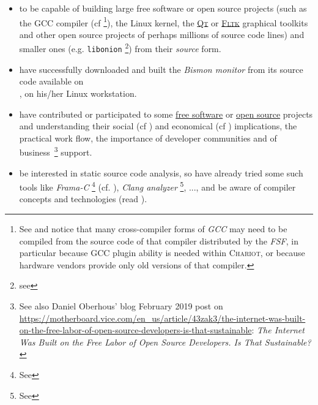 \begin{itemize}
\item to be capable of building large free software or open source projects (such as
  the GCC compiler (cf \cite{gcc-internals} \footnote{See
   and notice that many cross-compiler forms
  of \emph{GCC} may need to be compiled from the source code of that
  compiler distributed by the \emph{FSF}, in particular because GCC
  plugin ability is needed within \textsc{Chariot}, or because
  hardware vendors provide only old versions of that compiler.}), the
  Linux kernel, the \href{https://qt.io/}{\textsc{Qt}} or
  \href{https://www.fltk.org/}{\textsc{Fltk}} graphical toolkits and
  other open source projects of perhaps millions of source code lines)
  and smaller ones (e.g. \texttt{libonion} \footnote{see
  }) from their \emph{source}
   
   form.

\item have successfully downloaded and built the \emph{Bismon monitor}
   from its source code  available on
  \\ , on his/her Linux
  workstation.
  
\item have contributed or participated to some
  \href{https://www.gnu.org/philosophy/free-sw.en.html}{free software}
  or \href{https://opensource.org/}{open source} projects and
  understanding their social (cf \cite{Raymond:2001:CathBaz}) and
  economical (cf \cite{Weber:2004:SuccessOpenSource,
    Tirole:2018:eco-bien-commun, Nagle:2018:Contributing,
    DiCosmo:1998:Holdup, Lerner-Tirole:2000:economics-open-source})
  implications, the practical work flow, the importance of developer
  communities and of business~\footnote{See also Daniel Oberhous' blog
  February 2019 post on
  \url{https://motherboard.vice.com/en_us/article/43zak3/the-internet-was-built-on-the-free-labor-of-open-source-developers-is-that-sustainable}:
  \emph{The Internet Was Built on the Free Labor of Open Source
  Developers. Is That Sustainable?}} support.
  
\item be interested in static source code analysis, so have already
  tried some such tools like \emph{Frama-C} \footnote{See
    } (cf. \cite{Cuoq:2012:Frama-C}),
  \emph{Clang analyzer} \footnote{See
    }, ..., and be aware of
   compiler concepts and technologies (read
  \cite{Aho:2006:DragonBook}).


\end{itemize}
